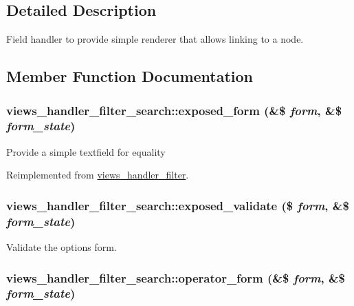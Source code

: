\subsection{Detailed Description}
Field handler to provide simple renderer that allows linking to a node. 

\subsection{Member Function Documentation}
\hypertarget{classviews__handler__filter__search_fc00db448aa56fcd91e9ab0dbbe7d1ac}{
\subsubsection[{exposed\_\-form}]{\setlength{\rightskip}{0pt plus 5cm}views\_\-handler\_\-filter\_\-search::exposed\_\-form (\&\$ {\em form}, \/  \&\$ {\em form\_\-state})}}
\label{classviews__handler__filter__search_fc00db448aa56fcd91e9ab0dbbe7d1ac}


Provide a simple textfield for equality 

Reimplemented from \hyperlink{classviews__handler__filter_f97b055d96353032bebd186c66bbb5eb}{views\_\-handler\_\-filter}.\hypertarget{classviews__handler__filter__search_e21a8ecf09164260d7f2f051b9dc28a6}{
\subsubsection[{exposed\_\-validate}]{\setlength{\rightskip}{0pt plus 5cm}views\_\-handler\_\-filter\_\-search::exposed\_\-validate (\$ {\em form}, \/  \&\$ {\em form\_\-state})}}
\label{classviews__handler__filter__search_e21a8ecf09164260d7f2f051b9dc28a6}


Validate the options form. \hypertarget{classviews__handler__filter__search_126abdcf04c59fd3e4be404ffd9969cf}{
\subsubsection[{operator\_\-form}]{\setlength{\rightskip}{0pt plus 5cm}views\_\-handler\_\-filter\_\-search::operator\_\-form (\&\$ {\em form}, \/  \&\$ {\em form\_\-state})}}
\label{classviews__handler__filter__search_126abdcf04c59fd3e4be404ffd9969cf}


